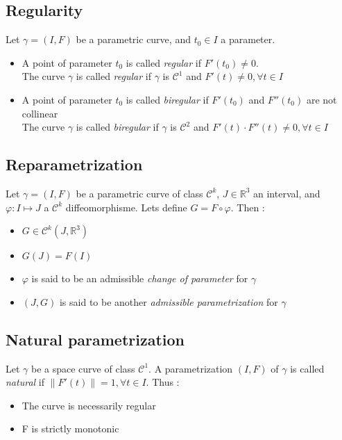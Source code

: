 \subsection{Regularity}
Let $\gamma=(I,F)$ be a parametric \cite{Bloomenthal} curve, and $t_0 \in I$ a parameter.
\begin{itemize}
\item A point of parameter $t_0$ is called \emph{regular} if $F'(t_0) \neq 0$.
\\The curve $\gamma$ is called \emph{regular} if $\gamma$ is $\mathcal{C}^{1}$ and $F'(t) \neq 0, \forall t \in I$
\item A point of parameter $t_0$ is called \emph{biregular} if $F'(t_0)$ and $F''(t_0)$ are not collinear
\\The curve $\gamma$ is called \emph{biregular} if $\gamma$ is $\mathcal{C}^{2}$ and  $F'(t)\cdot    F''(t) \neq 0, \forall t \in I$
\end{itemize}

\subsection{Reparametrization}
Let $\gamma=(I,F)$ be a parametric curve of class ${\mathcal{C}}^{k}$, $J \in {\mathbb{R}}^{3}$ an interval, and $\varphi\colon I\mapsto J$ a ${\mathcal{C}}^{k}$ diffeomorphisme. Lets define $G=F\circ\varphi$. Then :
\begin{itemize}
\item $G\in{\mathcal{C}}^{k}(J,{\mathbb{R}}^3)$
\item $G(J)=F(I)$
\item $\varphi$ is said to be an admissible \emph{change of parameter} for $\gamma$
\item  $(J,G)$ is said to be another \emph{admissible parametrization} for $\gamma$
\end{itemize}

\subsection{Natural parametrization}
Let $\gamma$ be a space curve of class ${\mathcal{C}}^{1}$. A parametrization $(I,F)$ of $\gamma$ is called \emph{natural} if $\|F'(t)\| = 1, \forall t \in I$. Thus :
\begin{itemize}
\item The curve is necessarily regular
\item F is strictly monotonic
\end{itemize}

